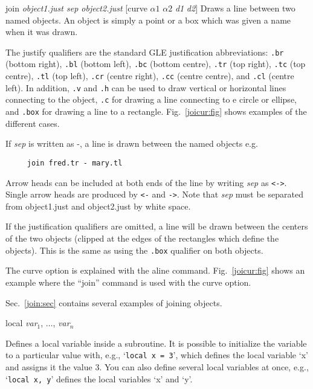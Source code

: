 \begin{commanddescription}

\item[{\sf join {\it object1.just sep object2.just} [curve {\it $\alpha1$} {\it $\alpha2$} {\it d1} {\it d2}]}]
\label{cmd:join}
Draws a line between two named objects. An object is simply a point or a box which was given a name when it was drawn.

The justify qualifiers are the standard GLE justification abbreviations: \verb#.br# (bottom right), \verb#.bl# (bottom left), \verb#.bc# (bottom centre), \verb#.tr# (top right), \verb#.tc# (top centre), \verb#.tl# (top left), \verb#.cr# (centre right), \verb#.cc# (centre centre), and \verb#.cl# (centre left). In addition, \verb#.v# and \verb#.h# can be used to draw vertical or horizontal lines connecting to the object, \verb#.c# for drawing a line connecting to e circle or ellipse, and \verb#.box# for drawing a line to a rectangle. Fig.~\ref{joicur:fig} shows examples of the different cases.

If {\it sep} is written as {\sf -}, a line is drawn between the named objects e.g.

\begin{Verbatim}
     join fred.tr - mary.tl
\end{Verbatim}

Arrow heads can be included at both ends of the line by writing {\it sep} as \verb#<->#. Single arrow heads are produced by \verb#<-# and \verb#->#.  Note that {\it sep} must be separated from object1.just and object2.just by white space.

If the justification qualifiers are omitted, a line will be drawn between the centers of the two objects (clipped at the edges of the rectangles which define the objects). This is the same as using the \verb#.box# qualifier on both objects.

The {\sf curve} option is explained with the {\sf aline} command. Fig.~\ref{joicur:fig} shows an example where the ``join'' command is used with the curve option.

Sec.~\ref{join:sec} contains several examples of joining objects.

\item[{\sf local {\it var}$_1$, $\ldots$, {\it var}$_n$}]

Defines a local variable inside a subroutine. It is possible to initialize the variable to a particular value with, e.g., `\texttt{local x = 3}', which defines the local variable `x' and assigns it the value 3. You can also define several local variables at once, e.g., `\texttt{local x, y}' defines the local variables `x' and `y'.


\end{commanddescription}
